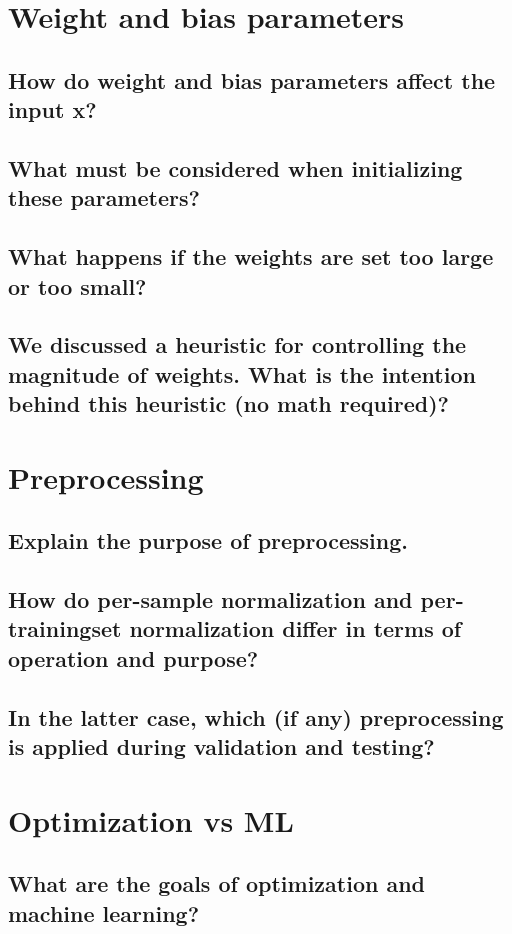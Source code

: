 \section{Weight and bias parameters}
\subsection{How do weight and bias parameters affect the input x?}
\subsection{What must be considered when initializing these parameters?}
\subsection{What happens if the weights are set too large or too small?}
\subsection{We discussed a heuristic for controlling the magnitude of weights. What is the intention behind this heuristic (no math required)?}

\section{Preprocessing}
\subsection{Explain the purpose of preprocessing.}
\subsection{How do per-sample normalization and per-trainingset normalization differ in terms of operation and purpose?}
\subsection{In the latter case, which (if any) preprocessing is applied during validation and testing?}

\section{Optimization vs ML}
\subsection{What are the goals of optimization and machine learning?}
